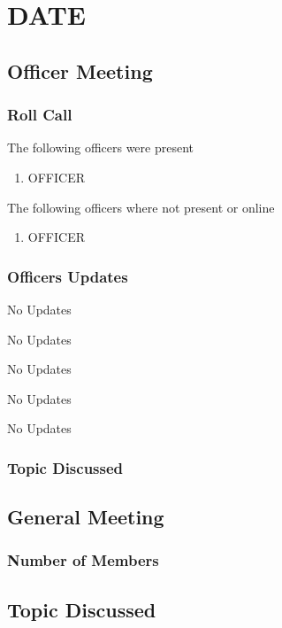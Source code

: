 \section{DATE}
\subsection{Officer Meeting}

\subsubsection{Roll Call}
The following officers were present

\begin{enumerate}
\item OFFICER
\end{enumerate}

The following officers where not present or online

\begin{enumerate}
    \item OFFICER
\end{enumerate}

\subsubsection{Officers Updates}

\textbf{\president}

No Updates

\textbf{\vicepresident}

No Updates

\textbf{\tresurer}

No Updates

\textbf{\primaryprogrammer}

No Updates

\textbf{\secretary}

No Updates

\subsubsection{Topic Discussed}

\subsection{General Meeting}
\subsubsection{Number of Members}
\subsection{Topic Discussed}